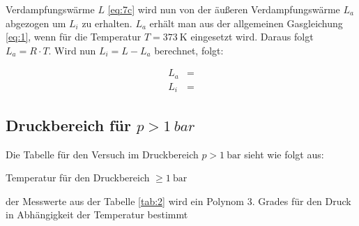 \justifying Verdampfungswärme $L$ \eqref{eq:7c} wird nun von der äußeren Verdampfungswärme $L_a$ abgezogen um $L_i$ zu 
erhalten. $L_a$ erhält man aus der allgemeinen Gasgleichung \eqref{eq:1}, wenn für die Temperatur $T = \SI{373}{\kelvin}$ eingesetzt wird. 
Daraus folgt $L_a = R \cdot T$. Wird nun $L_i = L - L_a$ berechnet, folgt:

\begin{subequations} \label{eq:8}
\begin{align}
    L_a &= \text{} \label{eq:8a}\\
    L_i &= \text{} \label{eq:8b}
\end{align}
\end{subequations}

\subsection{Druckbereich für $p > \SI{1}{bar}$}\label{sec:4.2}

Die Tabelle für den Versuch im Druckbereich $p> \SI{1}{\bar} $ sieht wie folgt aus:

\begin{table}[H]
    \centering
    
    \caption{Temperatur für den Druckbereich $\geq \SI{1}{\bar}$}
    \label{tab:2}
\end{table}

\justifying der Messwerte aus der Tabelle \ref{tab:2} wird ein Polynom
3. Grades für den Druck in Abhängigkeit der Temperatur bestimmt


